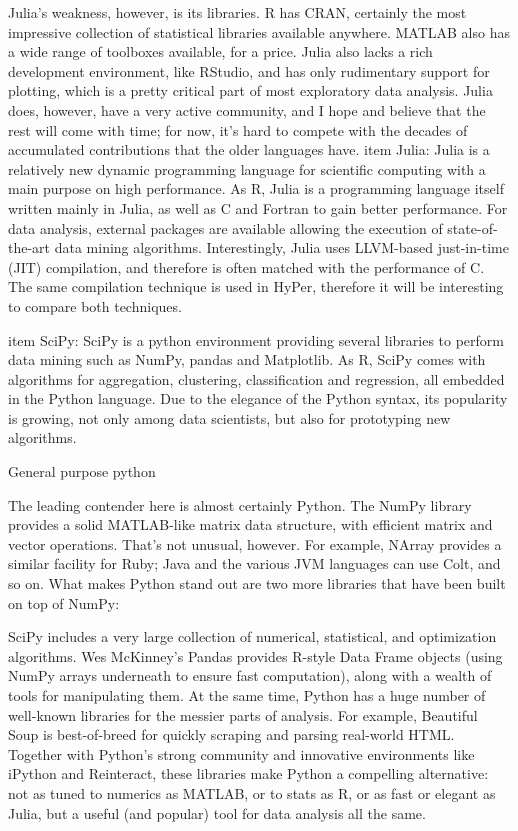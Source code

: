 Julia’s weakness, however, is its libraries. R has CRAN, certainly the most impressive collection of statistical libraries available anywhere. MATLAB also has a wide range of toolboxes available, for a price. Julia also lacks a rich development environment, like RStudio, and has only rudimentary support for plotting, which is a pretty critical part of most exploratory data analysis. Julia does, however, have a very active community, and I hope and believe that the rest will come with time; for now, it’s hard to compete with the decades of accumulated contributions that the older languages have.
item Julia: Julia is a relatively new dynamic programming language for scientific computing with a main purpose on high performance. As R, Julia is a programming language itself written mainly in Julia, as well as C and Fortran to gain better performance. For data analysis, external packages are available allowing the execution of state-of-the-art data mining algorithms. Interestingly, Julia uses LLVM-based just-in-time (JIT) compilation, and therefore is often matched with the performance of C. The same compilation technique is used in HyPer, therefore it will be interesting to compare both techniques.


item SciPy: SciPy is a python environment providing several libraries to perform data mining such as NumPy, pandas and Matplotlib. As R, SciPy comes with algorithms for aggregation, clustering, classification and regression, all embedded in the Python language. Due to the elegance of the Python syntax, its popularity is growing, not only among data scientists, but also for prototyping new algorithms.

General purpose python

The leading contender here is almost certainly Python. The NumPy library provides a solid MATLAB-like matrix data structure, with efficient matrix and vector operations. That’s not unusual, however. For example, NArray provides a similar facility for Ruby; Java and the various JVM languages can use Colt, and so on. What makes Python stand out are two more libraries that have been built on top of NumPy:

SciPy includes a very large collection of numerical, statistical, and optimization algorithms.
Wes McKinney’s Pandas provides R-style Data Frame objects (using NumPy arrays underneath to ensure fast computation), along with a wealth of tools for manipulating them.
At the same time, Python has a huge number of well-known libraries for the messier parts of analysis. For example, Beautiful Soup is best-of-breed for quickly scraping and parsing real-world HTML. Together with Python’s strong community and innovative environments like iPython and Reinteract, these libraries make Python a compelling alternative: not as tuned to numerics as MATLAB, or to stats as R, or as fast or elegant as Julia, but a useful (and popular) tool for data analysis all the same.


